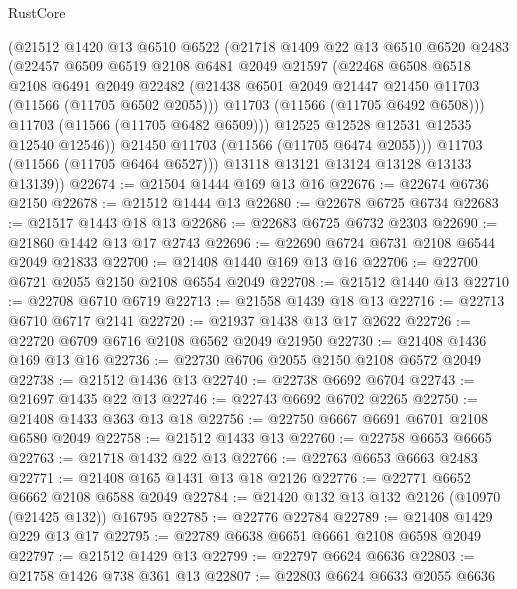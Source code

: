 \begin{lexlean}{RustCore}
\begin{coremodule}
            (@21512
              @1420
              @13
              @6510
              @6522
              (@21718
                @1409
                @22
                @13
                @6510
                @6520
                @2483
                (@22457
                  @6509
                  @6519
                  @2108
                  @6481
                  @2049
                  @21597
                  (@22468
                    @6508
                    @6518
                    @2108
                    @6491
                    @2049
                    @22482
                    (@21438 @6501 @2049 @21447 @21450 @11703 (@11566 (@11705 @6502 @2055)))
                    @11703
                    (@11566 (@11705 @6492 @6508)))
                  @11703
                  (@11566 (@11705 @6482 @6509)))
                @12525
                @12528
                @12531
                @12535
                @12540
                @12546))
            @21450
            @11703
            (@11566 (@11705 @6474 @2055)))
          @11703
          (@11566 (@11705 @6464 @6527)))
        @13118
        @13121
        @13124
        @13128
        @13133
        @13139))
@22674 := @21504 @1444 @169 @13 @16
@22676 := @22674 @6736 @2150
@22678 := @21512 @1444 @13
@22680 := @22678 @6725 @6734
@22683 := @21517 @1443 @18 @13
@22686 := @22683 @6725 @6732 @2303
@22690 := @21860 @1442 @13 @17 @2743
@22696 := @22690 @6724 @6731 @2108 @6544 @2049 @21833
@22700 := @21408 @1440 @169 @13 @16
@22706 := @22700 @6721 @2055 @2150 @2108 @6554 @2049
@22708 := @21512 @1440 @13
@22710 := @22708 @6710 @6719
@22713 := @21558 @1439 @18 @13
@22716 := @22713 @6710 @6717 @2141
@22720 := @21937 @1438 @13 @17 @2622
@22726 := @22720 @6709 @6716 @2108 @6562 @2049 @21950
@22730 := @21408 @1436 @169 @13 @16
@22736 := @22730 @6706 @2055 @2150 @2108 @6572 @2049
@22738 := @21512 @1436 @13
@22740 := @22738 @6692 @6704
@22743 := @21697 @1435 @22 @13
@22746 := @22743 @6692 @6702 @2265
@22750 := @21408 @1433 @363 @13 @18
@22756 := @22750 @6667 @6691 @6701 @2108 @6580 @2049
@22758 := @21512 @1433 @13
@22760 := @22758 @6653 @6665
@22763 := @21718 @1432 @22 @13
@22766 := @22763 @6653 @6663 @2483
@22771 := @21408 @165 @1431 @13 @18 @2126
@22776 := @22771 @6652 @6662 @2108 @6588 @2049
@22784 := @21420 @132 @13 @132 @2126 (@10970 (@21425 @132)) @16795
@22785 := @22776 @22784
@22789 := @21408 @1429 @229 @13 @17
@22795 := @22789 @6638 @6651 @6661 @2108 @6598 @2049
@22797 := @21512 @1429 @13
@22799 := @22797 @6624 @6636
@22803 := @21758 @1426 @738 @361 @13
@22807 := @22803 @6624 @6633 @2055 @6636

\end{coremodule}
\end{lexlean}
